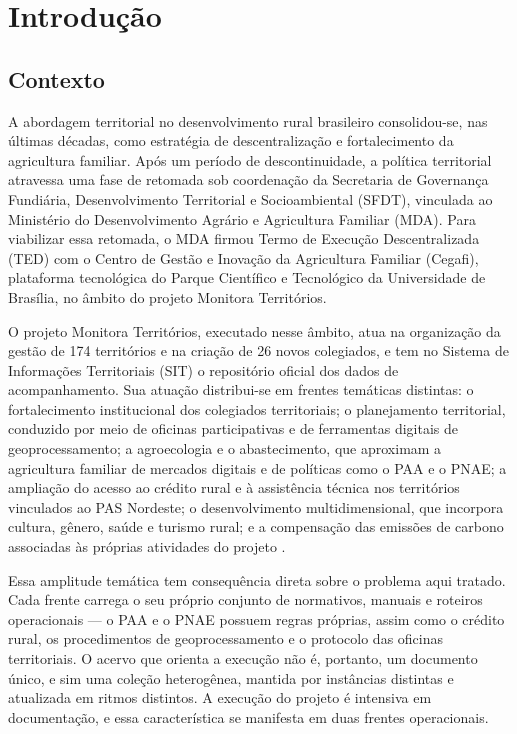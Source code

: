 \chapter[Introdução]{Introdução}
\label{chap:introducao}

\section{Contexto}
\label{sec:introducao-contexto}

A abordagem territorial no desenvolvimento rural brasileiro consolidou-se, nas
últimas décadas, como estratégia de descentralização e fortalecimento da
agricultura familiar. Após um período de descontinuidade, a política territorial
atravessa uma fase de retomada sob coordenação da Secretaria de Governança
Fundiária, Desenvolvimento Territorial e Socioambiental (SFDT), vinculada ao
Ministério do Desenvolvimento Agrário e Agricultura Familiar (MDA). Para
viabilizar essa retomada, o MDA firmou Termo de Execução Descentralizada (TED)
com o Centro de Gestão e Inovação da Agricultura Familiar (Cegafi), plataforma
tecnológica do Parque Científico e Tecnológico da Universidade de Brasília, no
âmbito do projeto Monitora Territórios.

O projeto Monitora Territórios, executado nesse âmbito, atua na organização da
gestão de 174 territórios e na criação de 26 novos colegiados, e tem no Sistema
de Informações Territoriais (SIT) o repositório oficial dos dados de
acompanhamento. Sua atuação distribui-se em frentes temáticas distintas: o
fortalecimento institucional dos colegiados territoriais; o planejamento
territorial, conduzido por meio de oficinas participativas e de ferramentas
digitais de geoprocessamento; a agroecologia e o abastecimento, que aproximam a
agricultura familiar de mercados digitais e de políticas como o PAA e o PNAE; a
ampliação do acesso ao crédito rural e à assistência técnica nos territórios
vinculados ao PAS Nordeste; o desenvolvimento multidimensional, que incorpora
cultura, gênero, saúde e turismo rural; e a compensação das emissões de carbono
associadas às próprias atividades do projeto \cite{cegafi2026}.

Essa amplitude temática tem consequência direta sobre o problema aqui tratado.
Cada frente carrega o seu próprio conjunto de normativos, manuais e roteiros
operacionais --- o PAA e o PNAE possuem regras próprias, assim como o crédito
rural, os procedimentos de geoprocessamento e o protocolo das oficinas
territoriais. O acervo que orienta a execução não é, portanto, um documento
único, e sim uma coleção heterogênea, mantida por instâncias distintas e
atualizada em ritmos distintos. A execução do projeto é intensiva em
documentação, e essa característica se manifesta em duas frentes operacionais.

